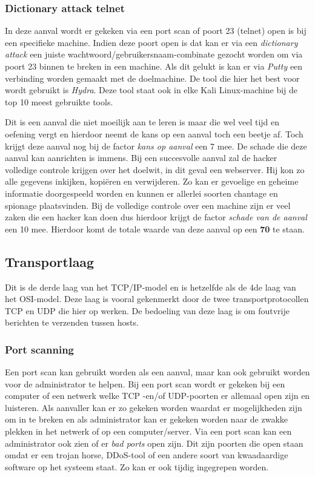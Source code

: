 \documentclass[pdftex,a4paper,12pt]{report}
\begin{document}
\subsubsection{Dictionary attack telnet}
In deze aanval wordt er gekeken via een port scan of poort 23 (telnet) open is bij een specifieke machine. Indien deze poort open is dat kan er via een \textit{dictionary attack} een juiste wachtwoord/gebruikersnaam-combinate gezocht worden om via poort 23 binnen te breken in een machine. Als dit gelukt is kan er via \textit{Putty} een verbinding worden gemaakt met de doelmachine. De tool die hier het best voor wordt gebruikt is \textit{Hydra}. Deze tool staat ook in elke Kali Linux-machine bij de top 10 meest gebruikte tools. \citep{Wilde2013} \newline

Dit is een aanval die niet moeilijk aan te leren is maar die wel veel tijd en oefening vergt en hierdoor neemt de kans op een aanval toch een beetje af. Toch krijgt deze aanval nog bij de factor \textit{kans op aanval} een 7 mee. De schade die deze aanval kan aanrichten is immens. Bij een succesvolle aanval zal de hacker volledige controle krijgen over het doelwit, in dit geval een webserver. Hij kon zo alle gegevens inkijken, kopiëren en verwijderen. Zo kan er gevoelige en geheime informatie doorgespeeld worden en kunnen er allerlei soorten chantage en spionage plaatsvinden. Bij de volledige controle over een machine zijn er veel zaken die een hacker kan doen dus hierdoor krijgt de factor \textit{schade van de aanval} een 10 mee. Hierdoor komt de totale waarde van deze aanval op een \textbf{70} te staan.

\subsection{Transportlaag}
Dit is de derde laag van het TCP/IP-model en is hetzelfde als de 4de laag van het OSI-model. Deze laag is vooral gekenmerkt door de twee transportprotocollen TCP en UDP die hier op werken. De bedoeling van deze laag is om foutvrije berichten te verzenden tussen hosts. \citep{Thomas2013}

\subsubsection{Port scanning}
Een port scan kan gebruikt worden als een aanval, maar kan ook gebruikt worden voor de administrator te helpen. Bij een port scan wordt er gekeken bij een computer of een netwerk welke TCP -en/of UDP-poorten er allemaal open zijn en luisteren. Als aanvaller kan er zo gekeken worden waardat er mogelijkheden zijn om in te breken en als administrator kan er gekeken worden naar de zwakke plekken in het netwerk of op een computer/server. Via een port scan kan een administrator ook zien of er \textit{bad ports} open zijn. Dit zijn poorten die open staan omdat er een trojan horse, DDoS-tool of een andere soort van kwaadaardige software op het systeem staat. Zo kan er ook tijdig ingegrepen worden. \citep{Kessler2001} \newline
\end{document}
